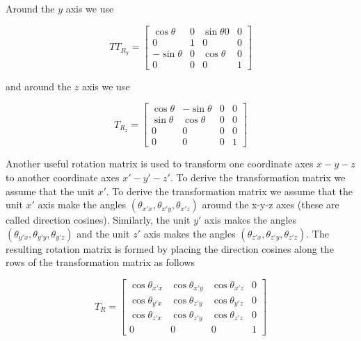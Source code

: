 Around the $y$ axis we use

\begin{equation}\label{eq:3.11}
TT_{R_y} = \left[\begin{array}{cccc}
\cos\theta & 0 & \sin\theta0 & 0 \\
0 & 1 & 0 & 0 \\
-\sin\theta & 0 & \cos\theta & 0 \\
0 & 0 & 0 & 1
\end{array}\right]
\end{equation}

and around the $z$ axis we use

\begin{equation}\label{eq:3.12}
T_{R_z} = \left[\begin{array}{cccc}
\cos\theta & -\sin\theta & 0 & 0 \\
\sin\theta & \cos\theta & 0 & 0 \\
0 & 0 & 0 & 0 \\
0 & 0 & 0 & 1
\end{array}\right]
\end{equation}

Another useful rotation matrix is used to transform one coordinate axes $x-y-z$ to another coordinate axes $x'-y'-z'$. To derive the transformation matrix we assume that the unit $x'$. To derive the transformation matrix we assume that the unit $x'$ axis make the angles $(\theta_{x'x},\theta_{x'y},\theta_{x'z})$ around the x-y-z axes (these are called direction cosines). Similarly, the unit $y'$ axis makes the angles $(\theta_{y'x},\theta_{y'y},\theta_{y'z})$ and the unit $z'$ axis makes the angles $(\theta_{z'x},\theta_{z'y},\theta_{z'z})$. The resulting rotation matrix is formed by placing the direction cosines along the rows of the transformation matrix as follows

\begin{equation}\label{eq:3.13}
T_R = \left[\begin{array}{cccc}
\cos\theta_{x'x} & \cos\theta_{x'y} & \cos\theta_{x'z} & 0 \\
\cos\theta_{y'x} & \cos\theta_{z'y} & \cos\theta_{y'z} & 0 \\
\cos\theta_{z'x} & \cos\theta_{z'y} & \cos\theta_{z'z} & 0 \\
0 & 0 & 0 & 1
\end{array}\right]
\end{equation}


